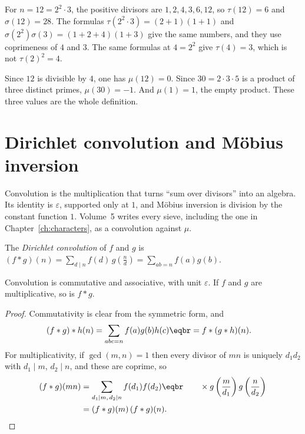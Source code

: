 \begin{examplex}
For $n=12=2^2\cdot 3$, the positive divisors are $1,2,4,3,6,12$, so $\tau(12)=6$ and $\sigma(12)=28$.
The formulas $\tau(2^2\cdot 3)=(2+1)(1+1)$ and $\sigma(2^2)\sigma(3)=(1+2+4)(1+3)$ give the same numbers, and they use coprimeness of $4$ and $3$.
The same formulas at $4=2^2$ give $\tau(4)=3$, which is not $\tau(2)^2=4$.
\end{examplex}

\begin{examplex}
Since $12$ is divisible by $4$, one has $\mu(12)=0$.
Since $30=2\cdot 3\cdot 5$ is a product of three distinct primes, $\mu(30)=-1$.
And $\mu(1)=1$, the empty product. These three values are the whole definition.
\end{examplex}

\section{Dirichlet convolution and M\"obius inversion}

Convolution is the multiplication that turns ``sum over divisors'' into an algebra. Its identity is $\varepsilon$, supported only at $1$, and M\"obius inversion is division by the constant function $1$. Volume~5 writes every sieve, including the one in Chapter~\ref{ch:characters}, as a convolution against $\mu$.

\begin{definition}
The \emph{Dirichlet convolution} of $f$ and $g$ is $(f*g)(n)=\displaystyle\sum_{d\mid n}f(d)\,g\!\left(\frac nd\right)=\sum_{ab=n}f(a)g(b)$.
\end{definition}

\begin{proposition}\label{prop:conv}
Convolution is commutative and associative, with unit $\varepsilon$. If $f$ and $g$ are multiplicative, so is $f*g$.
\end{proposition}
\begin{proof}
Commutativity is clear from the symmetric form, and
\[\begin{aligned}(f*g)*h(n)&=\sum_{abc=n}f(a)g(b)h(c)\eqbr=f*(g*h)(n).\end{aligned}\] For multiplicativity, if $\gcd(m,n)=1$ then every divisor of $mn$ is uniquely $d_1d_2$ with $d_1\mid m$, $d_2\mid n$, and these are coprime, so
\[\begin{aligned}(f*g)(mn)&=\sum_{d_1\mid m,\,d_2\mid n}f(d_1)f(d_2)\eqbr\qquad\times g\left(\frac m{d_1}\right)g\left(\frac n{d_2}\right)\\&=(f*g)(m)\,(f*g)(n).\end{aligned}\]
\end{proof}

